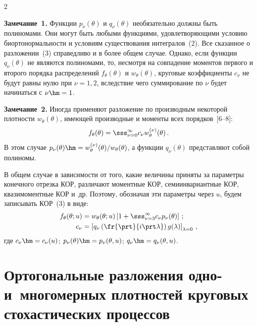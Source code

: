 \begin{multicols}{2}
\medskip

\noindent
\textbf{Замечание~1.} 
Функции $p_\nu(\theta)$ и $q_\nu (\theta)$
необязательно должны быть полиномами. Они могут быть любыми
функциями, удовлетворяющими условию биортонормальности и условиям
существования интегралов~(2). Все сказанное о разложении~(3)
справедливо и в более общем случае. Однако, если функции
$q_\nu(\theta)$ не являются полиномами, то, несмотря на совпадение
моментов первого и второго порядка распределений $f_\theta(\theta)$
и $w_\theta(\theta)$, круговые коэффициенты $c_\nu$ не будут равны
нулю при  $\nu=1,2$, вследствие чего суммирование по  $\nu$ будет
начинаться с $\nu\hm=1$.

\medskip

\noindent
\textbf{Замечание~2.} Иногда применяют разложение по производным некоторой плот\-ности 
$w_\theta(\theta)$, име\-ющей производные и моменты всех порядков~[6--8]:
    $$
    f_\theta(\theta) =\sss_{\nu=0}^\infty c_\nu w_\theta^{(\nu)} (\theta)\,.
    $$
В этом случае $p_\nu (\theta) \hm= w_\theta^{(\nu)}(\theta)/w_\theta(\theta)$, 
а  функции  $q_\nu(\theta)$ представляют собой полиномы.

В общем случае в зависимости от того, какие величины приняты за
параметры конечного отрезка КОР, различают моментные КОР,
семиинвариантные КОР, квазимоментные КОР и~др. Поэтому, обозначая
эти параметры через $u$, будем записывать КОР~(3) в виде:
\begin{align*}
f_\theta(\theta;u)&= w_\theta(\theta;u) \left[ 1+ \sss_{\nu=3}^\infty c_\nu 
p_\nu(\theta)\right]\,;\\
c_\nu &=\left[ q_\nu \left( \fr{\prt}{i\prt \lambda}\right) 
g(\lambda)\right]_{\lambda=0}\,,
\end{align*}
где $c_\nu\hm= c_\nu (u)$; $p_\nu (\theta) \hm=p_\nu (\theta,u)$; 
$q_\nu \hm= q_\nu (\theta, u)$.


\section{Ортогональные разложения одно- 
и~многомерных плотностей круговых стохастических процессов}


\end{multicols}
